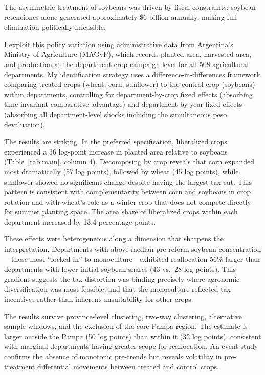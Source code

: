 \documentclass[12pt]{article}
\begin{document}
The asymmetric treatment of soybeans was driven by fiscal constraints: soybean retenciones alone generated approximately \$6 billion annually, making full elimination politically infeasible.

I exploit this policy variation using administrative data from Argentina's Ministry of Agriculture (MAGyP), which records planted area, harvested area, and production at the department-crop-campaign level for all 508 agricultural departments. My identification strategy uses a difference-in-differences framework comparing treated crops (wheat, corn, sunflower) to the control crop (soybeans) within departments, controlling for department-by-crop fixed effects (absorbing time-invariant comparative advantage) and department-by-year fixed effects (absorbing all department-level shocks including the simultaneous peso devaluation).

The results are striking. In the preferred specification, liberalized crops experienced a 36 log-point increase in planted area relative to soybeans (Table~\ref{tab:main}, column 4). Decomposing by crop reveals that corn expanded most dramatically (57 log points), followed by wheat (45 log points), while sunflower showed no significant change despite having the largest tax cut. This pattern is consistent with complementarity between corn and soybeans in crop rotation and with wheat's role as a winter crop that does not compete directly for summer planting space. The area share of liberalized crops within each department increased by 13.4 percentage points.

These effects were heterogeneous along a dimension that sharpens the interpretation. Departments with above-median pre-reform soybean concentration---those most ``locked in'' to monoculture---exhibited reallocation 56\% larger than departments with lower initial soybean shares (43 vs.\ 28 log points). This gradient suggests the tax distortion was binding precisely where agronomic diversification was most feasible, and that the monoculture reflected tax incentives rather than inherent unsuitability for other crops.

The results survive province-level clustering, two-way clustering, alternative sample windows, and the exclusion of the core Pampa region. The estimate is larger outside the Pampa (50 log points) than within it (32 log points), consistent with marginal departments having greater scope for reallocation. An event study confirms the absence of monotonic pre-trends but reveals volatility in pre-treatment differential movements between treated and control crops.
\end{document}

